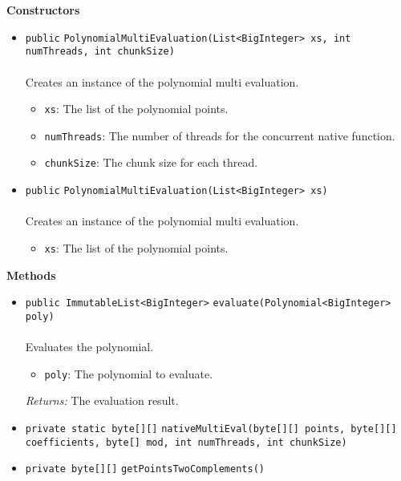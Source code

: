 \textbf{\sffamily Constructors}
\begin{itemize}
\item \lstinline|public| \lstinline|PolynomialMultiEvaluation|\lstinline|(List<BigInteger> xs, int numThreads, int chunkSize)|\\ \\[-0.6em]
Creates an instance of the polynomial multi evaluation.
\begin{itemize}
\item \lstinline|xs|: The list of the polynomial points.
\item \lstinline|numThreads|: The number of threads for the concurrent native function.
\item \lstinline|chunkSize|: The chunk size for each thread.
\end{itemize}



\item \lstinline|public| \lstinline|PolynomialMultiEvaluation|\lstinline|(List<BigInteger> xs)|\\ \\[-0.6em]
Creates an instance of the polynomial multi evaluation.
\begin{itemize}
\item \lstinline|xs|: The list of the polynomial points.
\end{itemize}



\end{itemize}


\textbf{\sffamily Methods}
\begin{itemize}
\item \lstinline|public ImmutableList<BigInteger>| \lstinline|evaluate|\lstinline|(Polynomial<BigInteger> poly)|\\ \\[-0.6em]
Evaluates the polynomial.
\begin{itemize}
\item \lstinline|poly|: The polynomial to evaluate.
\end{itemize}

\emph{Returns:} The evaluation result.

\item \lstinline|private static byte[][]| \lstinline|nativeMultiEval|\lstinline|(byte[][] points, byte[][] coefficients, byte[] mod, int numThreads, int chunkSize)| \\[-0.6em]




\item \lstinline|private byte[][]| \lstinline|getPointsTwoComplements|\lstinline|()| \\[-0.6em]




\end{itemize}

